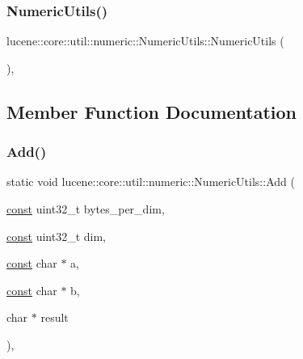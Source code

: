\subsubsection{\texorpdfstring{Numeric\+Utils()}{NumericUtils()}}
{\footnotesize\ttfamily lucene\+::core\+::util\+::numeric\+::\+Numeric\+Utils\+::\+Numeric\+Utils (\begin{DoxyParamCaption}{ }\end{DoxyParamCaption})\hspace{0.3cm}{\ttfamily [inline]}, {\ttfamily [private]}}



\subsection{Member Function Documentation}
\mbox{\label{classlucene_1_1core_1_1util_1_1numeric_1_1NumericUtils_af46b1eb966d5889c7944e479c7d58cda}} 
\subsubsection{\texorpdfstring{Add()}{Add()}}
{\footnotesize\ttfamily static void lucene\+::core\+::util\+::numeric\+::\+Numeric\+Utils\+::\+Add (\begin{DoxyParamCaption}\item[{\mbox{\hyperlink{ZlibCrc32_8h_a2c212835823e3c54a8ab6d95c652660e}{const}} uint32\+\_\+t}]{bytes\+\_\+per\+\_\+dim,  }\item[{\mbox{\hyperlink{ZlibCrc32_8h_a2c212835823e3c54a8ab6d95c652660e}{const}} uint32\+\_\+t}]{dim,  }\item[{\mbox{\hyperlink{ZlibCrc32_8h_a2c212835823e3c54a8ab6d95c652660e}{const}} char $\ast$}]{a,  }\item[{\mbox{\hyperlink{ZlibCrc32_8h_a2c212835823e3c54a8ab6d95c652660e}{const}} char $\ast$}]{b,  }\item[{char $\ast$}]{result }\end{DoxyParamCaption})\hspace{0.3cm}{\ttfamily [inline]}, {\ttfamily [static]}}

\mbox{\label{classlucene_1_1core_1_1util_1_1numeric_1_1NumericUtils_a6718491f88ea4f131610e50fb856a95e}} 
